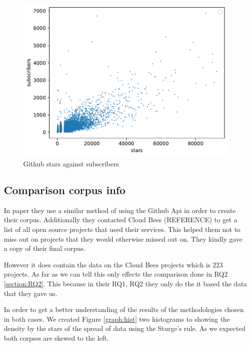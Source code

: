 \documentclass[twoside,12pt,titlepage,a4paper]{article}
\begin{document}
\begin{figure}[!htbp]
  \centering
  \includegraphics[width=\textwidth]{../src/results/sub vs stars.pdf}
  \caption[alt text]{Github stars against subscribers}
  \label{graph_scatter_stars_vs_subs}
\end{figure}

\vspace*{-0.05in}
\subsection{Comparison corpus info}
\label{section:HiltonComaprisonCoprusTHing}
\vspace*{-0.05in}
In \citet{Hilton2016} paper they use a similar method of using the Github Api in order to create their corpus. Additionally they contacted Cloud Bees (REFERENCE) to get a list of all open source projects that used their services. This helped them not to miss out on projects that they would otherwise missed out on. They kindly gave a copy of their final corpus. 

However it does contain the data on the Cloud Bees projects which is 223 projects. As far as we can tell this only effects the comparison done in RQ2 \ref{section:RQ2}. This because in their RQ1, RQ2 they only do the it based the data that they gave us. 

In order to get a better understanding of the results of the methodologies chosen in both cases. We created Figure \ref{graph:hist} two histograms to showing the density by the stars of the spread of data using the Sturge's rule. As we expected both corpses are skewed to the left.  
\end{document}

